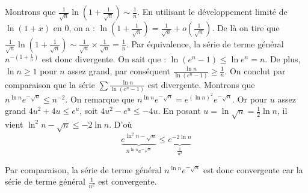 {{Montrons que $\frac{1}{\sqrt{n}}\ln{\left(1+\frac{1}{\sqrt{n}}\right)} \sim \frac{1}{n}$.
En utilisant le développement limité de $\ln (1 +x)$ en $0$, on a :
$\ln \left(1+\frac{1}{\sqrt{n}}\right) = \frac{1}{\sqrt{n}} + o\left(\frac{1}{\sqrt{n}}\right)$.
De là on tire que $\frac{1}{\sqrt{n}}\ln{\left(1+\frac{1}{\sqrt{n}}\right)} 
\sim \frac{1}{\sqrt{n}} \times \frac{1}{\sqrt{n}} = \frac{1}{n}$.
Par équivalence, la série de terme général $n^{-\left(1+\frac{1}{n}\right) }$ est donc divergente.
On sait que :
$\ln{(e^n-1)} \le \ln{e^n} = n$. De plus, $ \ln n \ge 1$ pour $n$  assez grand, par conséquent
$\frac{\ln n}{\ln (e^n-1)} \ge \frac{1}{n}$. On conclut par comparaison 
que la série $\sum \frac{\ln n }{\ln{(e^n-1)}}$ est divergente.
Montrons que $n^{\ln n }e^{-\sqrt{n}} \le n^{-2}$.
On remarque que $ n^{\ln n }e^{-\sqrt{n}} = e^{(\ln n)^2}e^{-\sqrt{n}}$. 
Or pour $u$ assez grand $4u^2 + 4u \le e^u $, soit $4u^2 - e^u \le - 4u$.
En posant $u = \ln \sqrt{n} = \frac{1}{2} \ln n$, il vient $\ln^2{n} - \sqrt{n} \le -2\ln n$.
D'où 
\[
\underbrace{e^{\ln^2{n}-\sqrt{n}}}_{n^{\ln n }e^{-\sqrt{n}}} \le \underbrace{e^{-2\ln n }}_{\frac{1}{n^2}}
\]

Par comparaison, la série de terme général $n^{\ln n }e^{-\sqrt{n} }$ est donc convergente 
car la série de terme général $\frac{1}{n^2}$ est convergente.
}
}
